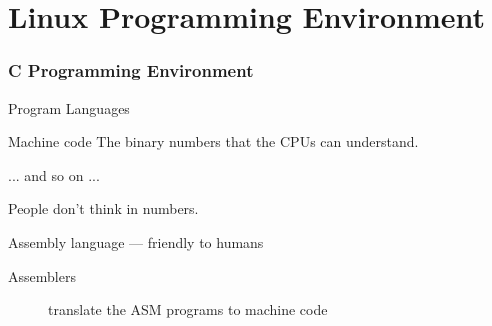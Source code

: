 \mode*
\part{Linux Programming Environment}

\section{C Programming Environment}
\label{sec:c-programming-basics}

\begin{frame}{Program Languages}
  \begin{block}{Machine code}
    The \alert{binary numbers} that the CPUs can understand.
    \begin{center}{ ... and so on ...}
    \end{center}
    People don't think in numbers.
  \end{block}
  \begin{block}{Assembly language --- friendly to humans}
    \begin{center}
    \end{center}
    \begin{description}
    \item[Assemblers] translate the ASM programs to machine code
    \end{description}
  \end{block}
\end{frame}

